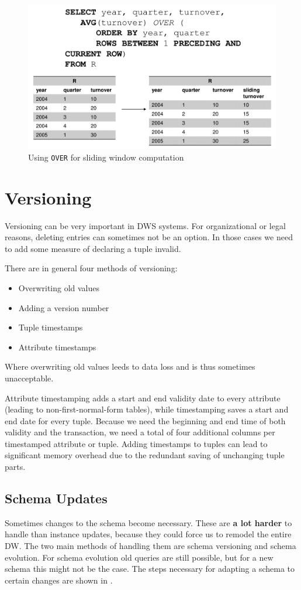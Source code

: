 \documentclass{article}
\begin{document}
\begin{figure}[hp]
    \centering
    \includegraphics[width=\textwidth]{window.png}
    \caption{Using \lstinline{OVER} for sliding window computation}
    \label{fig:window}
\end{figure}

\section{Versioning}
Versioning can be very important in DWS systems.
For organizational or legal reasons, deleting entries can sometimes not be an option.
In those cases we need to add some measure of declaring a tuple invalid.

There are in general four methods of versioning:
\begin{itemize}
    \item Overwriting old values
    \item Adding a version number
    \item Tuple timestamps
    \item Attribute timestamps
\end{itemize}
Where overwriting old values leeds to data loss and is thus sometimes unacceptable.

Attribute timestamping adds a start and end validity date to every attribute (leading to non-first-normal-form tables), while timestamping saves a start and end date for every tuple.
Because we need the beginning and end time of both validity and the transaction, we need a total of four additional columns per timestamped attribute or tuple.
Adding timestamps to tuples can lead to significant memory overhead due to the redundant saving of unchanging tuple parts.

\subsection{Schema Updates}
Sometimes changes to the schema become necessary.
These are \textbf{a lot harder} to handle than instance updates, because they could force us to remodel the entire DW.
The two main methods of handling them are schema versioning and schema evolution.
For schema evolution old queries are still possible, but for a new schema this might not be the case.
The steps necessary for adapting a schema to certain changes are shown in .
\end{document}
